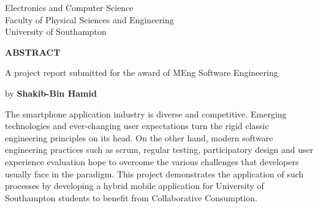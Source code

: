\thispagestyle{plain}
\begin{center}
    \large
    Electronics and Computer Science\\
    Faculty of Physical Sciences and Engineering\\
    University of Southampton\\
        
    \vspace{1.5cm}
    
    \textbf{ABSTRACT}
    
    \vspace{1.5cm}
    
    A project report submitted for the award of MEng Software Engineering
    
    \large
    by \textbf{Shakib-Bin Hamid}
\end{center}

\vspace{1.5cm}
    
\large
The smartphone application industry is diverse and competitive. Emerging technologies and ever-changing user expectations turn the rigid classic engineering principles on its head. On the other hand, modern software engineering practices such as scrum, regular testing, participatory design and user experience evaluation hope to overcome the various challenges that developers usually face in the paradigm. This project demonstrates the application of such processes by developing a hybrid mobile application for University of Southampton students to benefit from Collaborative Consumption.